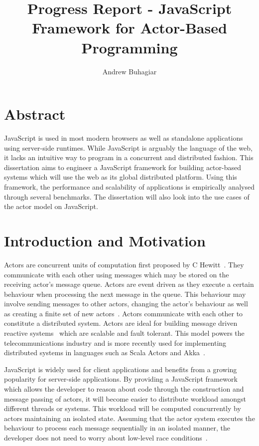 \documentclass[12pt]{report}
\author{Andrew Buhagiar}
\title{Progress Report - JavaScript Framework for Actor-Based Programming}
\begin{document}
\maketitle
\tableofcontents
\listoffigures
\newpage
\section{Abstract}
JavaScript is used in most modern browsers as well as standalone applications using server-side runtimes. While JavaScript is arguably the language of the web, it lacks an intuitive way to program in a concurrent and distributed fashion. This dissertation aims to engineer a JavaScript framework for building actor-based systems which will use the web as its global distributed platform. Using this framework, the performance and scalability of applications is empirically analysed through several benchmarks. The dissertation will also look into the use cases of the actor model on JavaScript.
\section{Introduction and Motivation}
Actors\cite{43years} are concurrent units of computation first proposed by C Hewitt~\cite{hewitt1973session}. They communicate with each other using messages which may be stored on the receiving actor's message queue. Actors are event driven as they execute a certain behaviour when processing the next message in the queue. This behaviour may involve sending messages to other actors, changing the actor's behaviour as well as creating a finite set of new actors~\cite{hewitt2010actor}. Actors communicate with each other to constitute a distributed system. Actors are ideal for building message driven reactive systems~\cite{reactivemanifesto} which are scalable and fault tolerant. This model powers the telecommunications industry and is more recently used for implementing distributed systems in languages such as Scala Actors and Akka~\cite{haller2012integration}.

JavaScript is widely used for client applications and benefits from a growing popularity for server-side applications. By providing a JavaScript framework which allows the developer to reason about code through the construction and message passing of actors, it will become easier to distribute workload amongst different threads or systems. This workload will be computed concurrently by actors maintaining an isolated state. Assuming that the actor system executes the behaviour to process each message sequentially in an isolated manner, the developer does not need to worry about low-level race conditions~\cite{43years}\cite{haller2010isolated}. 
\end{document}

